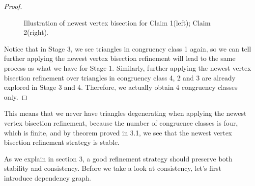 \begin{proof}
\begin{figure}[h!]
    \caption{Illustration of newest vertex bisection for Claim 1(left); Claim 2(right).}
    \label{Fig8}
    \end{figure}



    Notice that in Stage 3, we see triangles in congruency class 1 again, so we can tell further applying the newest vertex bisection refinement will lead to the same process as what we have for Stage 1. Similarly, further applying the newest vertex bisection refinement over triangles in congruency class 4, 2 and 3 are already explored in Stage 3 and 4. Therefore, we actually obtain 4 congruency classes only.
    \end{proof}
    This means that we never have triangles degenerating when applying the newest vertex bisection refinement, because the number of congruence classes is four, which is finite, and by theorem proved in 3.1, we see that the newest vertex bisection refinement strategy is stable.

    As we explain in section 3, a good refinement strategy should preserve both stability and consistency. Before we take a look at consistency, let's first introduce dependency graph.

